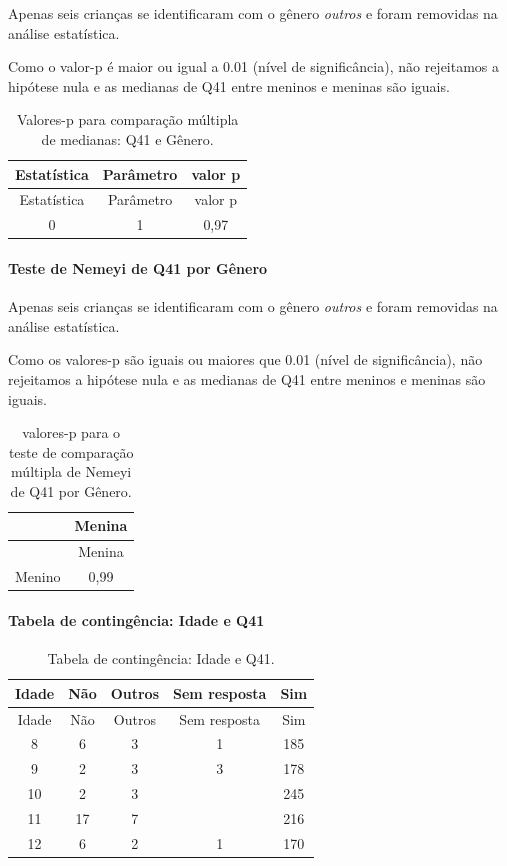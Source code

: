 \documentclass[]{article}
\let\oldparagraph\paragraph
\renewcommand{\paragraph}[1]{\oldparagraph{#1}\mbox{}}
\begin{document}
Apenas seis crianças se identificaram com o gênero \emph{outros} e foram removidas na análise estatística.

Como o valor-p é maior ou igual a 0.01 (nível de significância), não rejeitamos a hipótese nula e as medianas de Q41 entre meninos e meninas são iguais.

\begin{longtable}[]{@{}ccc@{}}
\caption{\label{tab:unnamed-chunk-1622}Valores-p para comparação múltipla de medianas: Q41 e Gênero.}\tabularnewline
\toprule
Estatística & Parâmetro & valor p\tabularnewline
\midrule
\endfirsthead
\toprule
Estatística & Parâmetro & valor p\tabularnewline
\midrule
\endhead
0 & 1 & 0,97\tabularnewline
\bottomrule
\end{longtable}

\hypertarget{teste-de-nemeyi-de-q41-por-guxeanero}{%
\paragraph{Teste de Nemeyi de Q41 por Gênero}\label{teste-de-nemeyi-de-q41-por-guxeanero}}

Apenas seis crianças se identificaram com o gênero \emph{outros} e foram removidas na análise estatística.

Como os valores-p são iguais ou maiores que 0.01 (nível de significância), não rejeitamos a hipótese nula e as medianas de Q41 entre meninos e meninas são iguais.

\begin{longtable}[]{@{}lc@{}}
\caption{\label{tab:unnamed-chunk-1624}valores-p para o teste de comparação múltipla de Nemeyi de Q41 por Gênero.}\tabularnewline
\toprule
& Menina\tabularnewline
\midrule
\endfirsthead
\toprule
& Menina\tabularnewline
\midrule
\endhead
Menino & 0,99\tabularnewline
\bottomrule
\end{longtable}

\cleardoublepage

\hypertarget{tabela-de-continguxeancia-idade-e-q41}{%
\paragraph{Tabela de contingência: Idade e Q41}\label{tabela-de-continguxeancia-idade-e-q41}}

\begin{longtable}[]{@{}ccccc@{}}
\caption{\label{tab:unnamed-chunk-1625}Tabela de contingência: Idade e Q41.}\tabularnewline
\toprule
Idade & Não & Outros & Sem resposta & Sim\tabularnewline
\midrule
\endfirsthead
\toprule
Idade & Não & Outros & Sem resposta & Sim\tabularnewline
\midrule
\endhead
8 & 6 & 3 & 1 & 185\tabularnewline
9 & 2 & 3 & 3 & 178\tabularnewline
10 & 2 & 3 & & 245\tabularnewline
11 & 17 & 7 & & 216\tabularnewline
12 & 6 & 2 & 1 & 170\tabularnewline
\bottomrule
\end{longtable}
\end{document}

